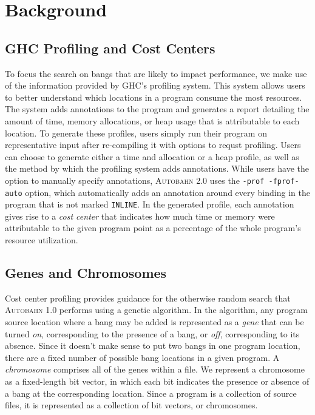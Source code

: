 \documentclass[format=sigplan, review=true]{acmart}
\newcommand{\Ao}[0]{\textsc{Autobahn 1.0}}
\newcommand{\At}[0]{\textsc{Autobahn 2.0}}
\begin{document}
\section{Background}

\subsection{GHC Profiling and Cost Centers}
To focus the search on bangs that are likely to impact performance, we
make use of the information provided by GHC's profiling system.
This system allows users to better understand which locations
in a program consume the most resources.  The system adds annotations
to the program and generates a report detailing the amount of time,
memory allocations, or heap usage that is attributable to each location.
To generate these profiles, users simply run their program on
representative input after re-compiling it with options to requst profiling.
Users can choose to generate either a time and allocation or a heap
profile, as well as the method by which the profiling system adds
annotations. While users have the option to manually specify
annotations, \At{} uses the \texttt{-prof -fprof-auto} option, which
automatically adds an annotation around every binding in the program
that is not marked \texttt{INLINE}.  In the generated profile, each
annotation gives rise to a \textit{cost center} that indicates how
much time or memory were attributable to the given program point as a
percentage of the whole program's resource utilization.  


\subsection{Genes and Chromosomes}

Cost center profiling provides guidance for the otherwise random
search that \Ao{} performs using a genetic algorithm. In the
algorithm, any program source location where a bang may be added is
represented as a \textit{gene} that can be turned \textit{on},
corresponding to the presence of a bang, or \textit{off},
corresponding to its absence.  Since it doesn't make sense to put two
bangs in one program location, there are a fixed number of possible
bang locations in a given program. A \textit{chromosome} comprises all
of the genes within a file. We represent a chromosome as a
fixed-length bit vector, in which each bit indicates the presence or
absence of a bang at the corresponding location. Since a program is a
collection of source files, it is represented as a collection of bit
vectors, or chromosomes.
\end{document}
